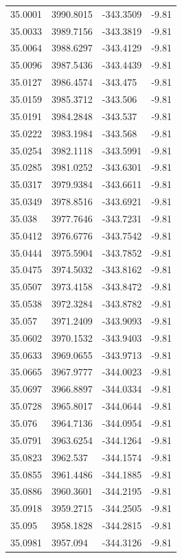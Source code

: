 \begin{table}[H]
\begin{tabular}{llll}
35.0001 & 3990.8015 & -343.3509 & -9.81 \\
35.0033 & 3989.7156 & -343.3819 & -9.81 \\
35.0064 & 3988.6297 & -343.4129 & -9.81 \\
35.0096 & 3987.5436 & -343.4439 & -9.81 \\
35.0127 & 3986.4574 & -343.475 & -9.81 \\
35.0159 & 3985.3712 & -343.506 & -9.81 \\
35.0191 & 3984.2848 & -343.537 & -9.81 \\
35.0222 & 3983.1984 & -343.568 & -9.81 \\
35.0254 & 3982.1118 & -343.5991 & -9.81 \\
35.0285 & 3981.0252 & -343.6301 & -9.81 \\
35.0317 & 3979.9384 & -343.6611 & -9.81 \\
35.0349 & 3978.8516 & -343.6921 & -9.81 \\
35.038 & 3977.7646 & -343.7231 & -9.81 \\
35.0412 & 3976.6776 & -343.7542 & -9.81 \\
35.0444 & 3975.5904 & -343.7852 & -9.81 \\
35.0475 & 3974.5032 & -343.8162 & -9.81 \\
35.0507 & 3973.4158 & -343.8472 & -9.81 \\
35.0538 & 3972.3284 & -343.8782 & -9.81 \\
35.057 & 3971.2409 & -343.9093 & -9.81 \\
35.0602 & 3970.1532 & -343.9403 & -9.81 \\
35.0633 & 3969.0655 & -343.9713 & -9.81 \\
35.0665 & 3967.9777 & -344.0023 & -9.81 \\
35.0697 & 3966.8897 & -344.0334 & -9.81 \\
35.0728 & 3965.8017 & -344.0644 & -9.81 \\
35.076 & 3964.7136 & -344.0954 & -9.81 \\
35.0791 & 3963.6254 & -344.1264 & -9.81 \\
35.0823 & 3962.537 & -344.1574 & -9.81 \\
35.0855 & 3961.4486 & -344.1885 & -9.81 \\
35.0886 & 3960.3601 & -344.2195 & -9.81 \\
35.0918 & 3959.2715 & -344.2505 & -9.81 \\
35.095 & 3958.1828 & -344.2815 & -9.81 \\
35.0981 & 3957.094 & -344.3126 & -9.81 \\

\end{tabular}
\end{table}
